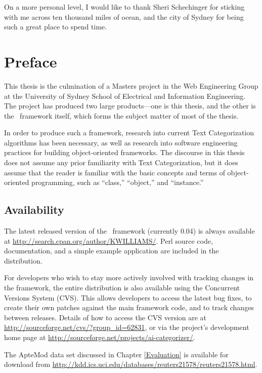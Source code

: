 On a more personal level, I would like to thank Sheri Schechinger for sticking
with me across ten thousand miles of ocean, and the city of Sydney for
being such a great place to spend time.

\chapter{Preface}

This thesis is the culmination of a Masters project in the Web
Engineering Group at the University of Sydney School of Electrical and
Information Engineering.  The project has produced two large
products---one is this thesis, and the other is the \aicat\ framework
itself, which forms the subject matter of most of the thesis.

In order to produce such a framework, research into current Text
Categorization algorithms has been necessary, as well as research into
software engineering practices for building object-oriented
frameworks.  The discourse in this thesis does not assume any prior
familiarity with Text Categorization, but it does assume that the
reader is familiar with the basic concepts and terms of
object-oriented programming, such as ``class,'' ``object,'' and
``instance.''


\section*{Availability}

The latest released version of the \aicat\ framework (currently 0.04)
is always available at
\url{http://search.cpan.org/author/KWILLIAMS/}.  Perl source code,
documentation, and a simple example application are included in the
distribution.

For developers who wish to stay more actively involved with tracking
changes in the framework, the entire distribution is also available
using the Concurrent Versions System (CVS).  This allows developers to
access the latest bug fixes, to create their own patches against the
main framework code, and to track changes between releases.  Details
of how to access the CVS version are at
\url{http://sourceforge.net/cvs/?group_id=62831}, or via the project's
development home page at
\url{http://sourceforge.net/projects/ai-categorizer/}.

The ApteMod data set discussed in Chapter \ref{Evaluation} is
available for download from
\url{http://kdd.ics.uci.edu/databases/reuters21578/reuters21578.html}.


